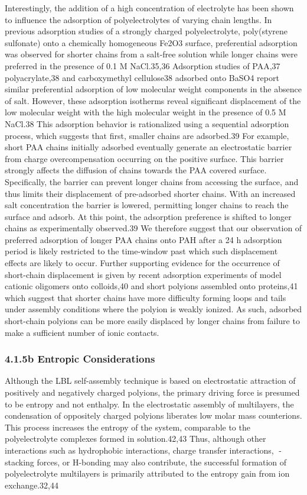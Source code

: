 \documentclass[journal=jacsat,manuscript=article]{achemso}
\begin{document}
Interestingly, the addition of a high concentration of electrolyte has been shown to influence the adsorption of polyelectrolytes of varying chain lengths.  In previous adsorption studies of a strongly charged polyelectrolyte, poly(styrene sulfonate) onto a chemically homogeneous Fe2O3 surface, preferential adsorption was observed for shorter chains from a salt-free solution while longer chains were preferred in the presence of 0.1 M NaCl.35,36  Adsorption studies of PAA,37 polyacrylate,38 and carboxymethyl cellulose38 adsorbed onto BaSO4 report similar preferential adsorption of low molecular weight components in the absence of salt.  However, these adsorption isotherms reveal significant displacement of the low molecular weight with the high molecular weight in the presence of 0.5 M NaCl.38  This adsorption behavior is rationalized using a sequential adsorption process, which suggests that first, smaller chains are adsorbed.39  For example, short PAA chains initially adsorbed eventually generate an electrostatic barrier from charge overcompensation occurring on the positive surface.  This barrier strongly affects the diffusion of chains towards the PAA covered surface.  Specifically, the barrier can prevent longer chains from accessing the surface, and thus limits their displacement of pre-adsorbed shorter chains.  With an increased salt concentration the barrier is lowered, permitting longer chains to reach the surface and adsorb.  At this point, the adsorption preference is shifted to longer chains as experimentally observed.39  We therefore suggest that our observation of preferred adsorption of longer PAA chains onto PAH after a 24 h adsorption period is likely restricted to the time-window past which such displacement effects are likely to occur.  Further supporting evidence for the occurrence of short-chain displacement is given by recent adsorption experiments of model cationic oligomers onto colloids,40 and short polyions assembled onto proteins,41 which suggest that shorter chains have more difficulty forming loops and tails under assembly conditions where the polyion is weakly ionized.  As such, adsorbed short-chain polyions can be more easily displaced by longer chains from failure to make a sufficient number of ionic contacts.  

\subsubsection{4.1.5b Entropic Considerations}

Although the LBL self-assembly technique is based on electrostatic attraction of positively and negatively charged polyions, the primary driving force is presumed to be entropy and not enthalpy.  In the electrostatic assembly of multilayers, the condensation of oppositely charged polyions liberates low molar mass counterions.  This process increases the entropy of the system, comparable to the polyelectrolyte complexes formed in solution.42,43  Thus, although other interactions such as hydrophobic interactions, charge transfer interactions, - stacking forces, or H-bonding may also contribute, the successful formation of polyelectrolyte multilayers is primarily attributed to the entropy gain from ion 
exchange.32,44  
\end{document}
